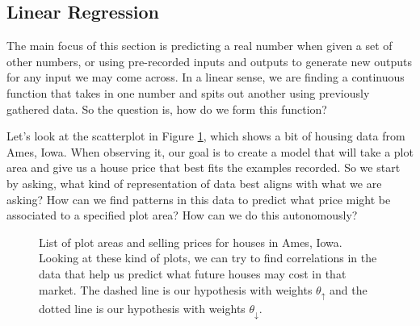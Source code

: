 \def\tu{\vec\theta_{\uparrow}}
\def\td{\vec\theta_{\downarrow}}

\subsection{Linear Regression}



The main focus of this section is predicting a real number when given a set of
other numbers, or using pre-recorded inputs and outputs to generate new outputs
for any input we may come across. In a linear sense, we are finding a continuous
function that takes in one number and spits out another using previously
gathered data. So the question is, how do we form this function?


Let's look at the scatterplot in Figure \ref{fig:hp}, which shows a bit of
housing data from Ames, Iowa. When observing it, our goal is to create a model
that will take a plot area and give us a house price that best fits the examples
recorded. So we start by asking, what kind of representation of data best aligns
with what we are asking? How can we find patterns in this data to predict what
price might be associated to a specified plot area? How can we do this
autonomously?

\begin{figure}[t!]
\centering
    \caption{List of plot areas and selling prices for houses in Ames, Iowa.
    Looking at these kind of plots, we can try to find correlations in the data
    that help us predict what future houses may cost in that market. The dashed line is our hypothesis with weights $\theta_{\uparrow}$ and the dotted line is our hypothesis with weights $\theta_{\downarrow}$.}
    \label{fig:hp}
\end{figure}

